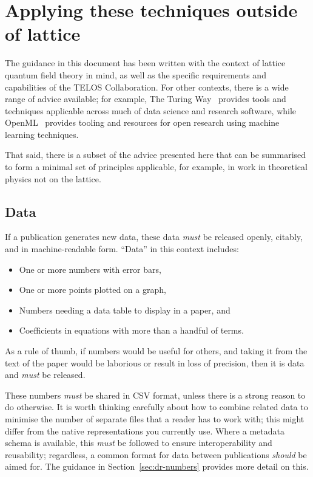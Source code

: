 \documentclass{article}
\newcommand\rfcword[1]{\emph{#1}\xspace}
\newcommand\must{\rfcword{must}}
\newcommand\should{\rfcword{should}}
\begin{document}
\clearpage
\section{Applying these techniques outside of lattice}\label{app:nonlattice}

The guidance in this document has been written
with the context of lattice quantum field theory in mind,
as well as the specific requirements and capabilities of the TELOS Collaboration.
For other contexts,
there is a wide range of advice available;
for example,
The Turing Way~\cite{the_turing_way_community_2023_7625728} provides
tools and techniques applicable across much of data science and research software,
while OpenML~\cite{OpenML2013}
provides tooling and resources for open research using machine learning techniques.

That said,
there is a subset of the advice presented here that can be summarised
to form a minimal set of principles applicable,
for example,
in work in theoretical physics not on the lattice.

\subsection{Data}

If a publication generates new data,
these data \must be released openly, citably, and in machine-readable form.
``Data'' in this context includes:
\begin{itemize}
  \item One or more numbers with error bars,
  \item One or more points plotted on a graph,
  \item Numbers needing a data table to display in a paper, and
  \item Coefficients in equations with more than a handful of terms.
\end{itemize}
As a rule of thumb,
if numbers would be useful for others,
and taking it from the text of the paper would be laborious
or result in loss of precision,
then it is data and \must be released.

These numbers \must be shared in CSV format,
unless there is a strong reason to do otherwise.
It is worth thinking carefully about how to combine related data
to minimise the number of separate files that a reader has to work with;
this might differ from the native representations you currently use.
Where a metadata schema is available,
this \must be followed to ensure interoperability and reusability;
regardless,
a common format for data between publications \should be aimed for.
The guidance in Section~\ref{sec:dr-numbers} provides more detail on this.
\end{document}
